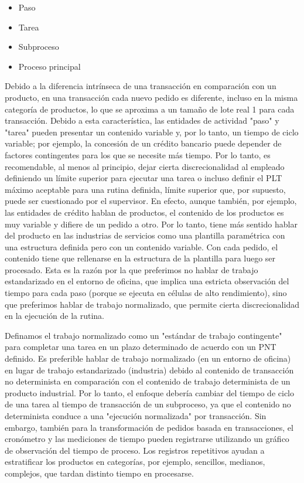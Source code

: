 \begin{itemize}
    \item Paso
    \item Tarea
    \item Subproceso
    \item Proceso principal
\end{itemize}

Debido a la diferencia intrínseca de una transacción en comparación con un producto, en una transacción cada nuevo pedido es diferente, incluso en la misma categoría de productos, lo que se aproxima a un tamaño de lote real 1 para cada transacción.
Debido a esta característica, las entidades de actividad "paso" y "tarea" pueden presentar un contenido variable y, por lo tanto, un tiempo de ciclo variable; por ejemplo, la concesión de un crédito bancario puede depender de factores contingentes para los que se necesite más tiempo.
Por lo tanto, es recomendable, al menos al principio, dejar cierta discrecionalidad al empleado definiendo un límite superior para ejecutar una tarea o incluso definir el PLT máximo aceptable para una rutina definida, límite superior que, por supuesto, puede ser cuestionado por el supervisor.
En efecto, aunque también, por ejemplo, las entidades de crédito hablan de productos, el contenido de los productos es muy variable y difiere de un pedido a otro.
Por lo tanto, tiene más sentido hablar del producto en las industrias de servicios como una plantilla paramétrica con una estructura definida pero con un contenido variable.
Con cada pedido, el contenido tiene que rellenarse en la estructura de la plantilla para luego ser procesado.
Esta es la razón por la que preferimos no hablar de trabajo estandarizado en el entorno de oficina, que implica una estricta observación del tiempo para cada paso (porque se ejecuta en células de alto rendimiento), sino que preferimos hablar de trabajo normalizado, que permite cierta discrecionalidad en la ejecución de la rutina.

Definamos el trabajo normalizado como un "estándar de trabajo contingente" para completar una tarea en un plazo determinado de acuerdo con un PNT definido.
Es preferible hablar de trabajo normalizado (en un entorno de oficina) en lugar de trabajo estandarizado (industria) debido al contenido de transacción no determinista en comparación con el contenido de trabajo determinista de un producto industrial.
Por lo tanto, el enfoque debería cambiar del tiempo de ciclo de una tarea al tiempo de transacción de un subproceso, ya que el contenido no determinista conduce a una "ejecución normalizada" por transacción.
Sin embargo, también para la transformación de pedidos basada en transacciones, el cronómetro y las mediciones de tiempo pueden registrarse utilizando un gráfico de observación del tiempo de proceso. Los registros repetitivos ayudan a estratificar los productos en categorías, por ejemplo, sencillos, medianos, complejos, que tardan distinto tiempo en procesarse.


